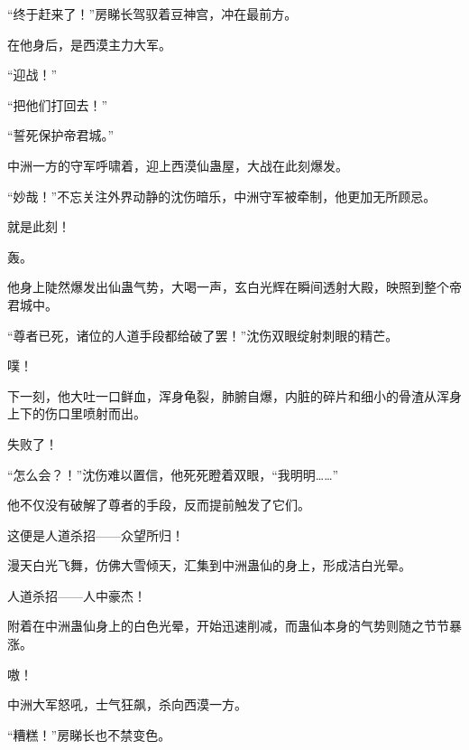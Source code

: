 \begin{this_body}
“终于赶来了！”房睇长驾驭着豆神宫，冲在最前方。

在他身后，是西漠主力大军。

“迎战！”

“把他们打回去！”

“誓死保护帝君城。”

中洲一方的守军呼啸着，迎上西漠仙蛊屋，大战在此刻爆发。

“妙哉！”不忘关注外界动静的沈伤暗乐，中洲守军被牵制，他更加无所顾忌。

就是此刻！

轰。

他身上陡然爆发出仙蛊气势，大喝一声，玄白光辉在瞬间透射大殿，映照到整个帝君城中。

“尊者已死，诸位的人道手段都给破了罢！”沈伤双眼绽射刺眼的精芒。

噗！

下一刻，他大吐一口鲜血，浑身龟裂，肺腑自爆，内脏的碎片和细小的骨渣从浑身上下的伤口里喷射而出。

失败了！

“怎么会？！”沈伤难以置信，他死死瞪着双眼，“我明明……”

他不仅没有破解了尊者的手段，反而提前触发了它们。

这便是人道杀招——众望所归！

漫天白光飞舞，仿佛大雪倾天，汇集到中洲蛊仙的身上，形成洁白光晕。

人道杀招——人中豪杰！

附着在中洲蛊仙身上的白色光晕，开始迅速削减，而蛊仙本身的气势则随之节节暴涨。

嗷！

中洲大军怒吼，士气狂飙，杀向西漠一方。

“糟糕！”房睇长也不禁变色。

\end{this_body}

